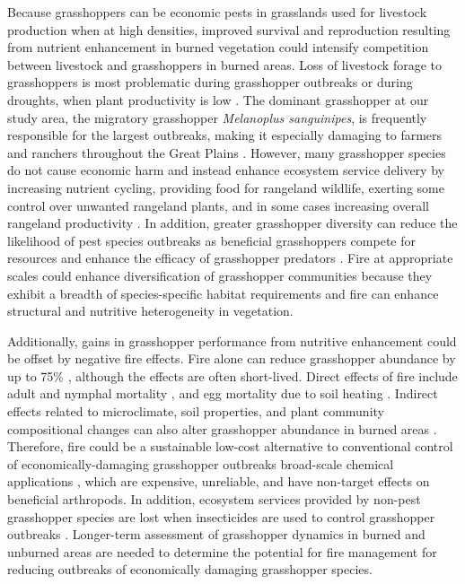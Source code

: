 \documentclass[referee, 
	            sn-basic]
           {sn-jnl}
\begin{document}
Because grasshoppers can be economic pests in grasslands used for livestock production when at high densities, improved survival and reproduction resulting from nutrient enhancement in burned vegetation could intensify competition between livestock and grasshoppers in burned areas. Loss of livestock forage to grasshoppers is most problematic during grasshopper outbreaks or during droughts, when plant productivity is low \citep{belovsky1995, joern2000, branson2014}. The dominant grasshopper at our study area, the migratory grasshopper \emph{Melanoplus sanguinipes}, is frequently responsible for the largest outbreaks, making it especially damaging to farmers and ranchers throughout the Great Plains \citep{onsager2000a, olfert2021}. However, many grasshopper species do not cause economic harm and instead enhance ecosystem service delivery by increasing nutrient cycling, providing food for rangeland wildlife, exerting some control over unwanted rangeland plants, and in some cases increasing overall rangeland productivity \citep{branson2006}. In addition, greater grasshopper diversity can reduce the likelihood of pest species outbreaks as beneficial grasshoppers compete for resources and enhance the efficacy of grasshopper predators \citep{branson2006}. Fire at appropriate scales could enhance diversification of grasshopper communities because they exhibit a breadth of species-specific habitat requirements and fire can enhance structural and nutritive heterogeneity in vegetation. 

Additionally, gains in grasshopper performance from nutritive enhancement could be offset by negative fire effects. Fire alone can reduce grasshopper abundance by up to 75\% \citep{branson2016}, although the effects are often short-lived. Direct effects of fire include adult and nymphal mortality \citep{bock1991}, and egg mortality due to soil heating \citep{branson2007, branson2013, branson2016, vermeire2004}. Indirect effects related to microclimate, soil properties, and plant community compositional changes can also alter grasshopper abundance in burned areas \citep{vanwingerden1991,schirmel2011, evans1983,matenaar2014, meyer2002}. Therefore, fire could be a sustainable low-cost alternative to conventional control of economically-damaging grasshopper outbreaks \textemdash broad-scale chemical applications \citep{branson2006}, which are expensive, unreliable, and have non-target effects on beneficial arthropods. In addition, ecosystem services provided by non-pest grasshopper species are lost when insecticides are used to control grasshopper outbreaks \citep{joern2000}. Longer-term assessment of grasshopper dynamics in burned and unburned areas are needed to determine the potential for fire management for reducing outbreaks of economically damaging grasshopper species.  
\end{document}
